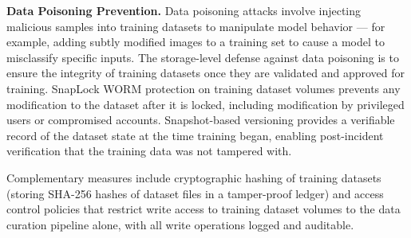 \begin{securitybox}
\textbf{Data Poisoning Prevention.}
Data poisoning attacks involve injecting malicious samples into training
datasets to manipulate model behavior --- for example, adding subtly modified
images to a training set to cause a model to misclassify specific inputs. The
storage-level defense against data poisoning is to ensure the integrity of
training datasets once they are validated and approved for training. SnapLock
WORM protection on training dataset volumes prevents any modification to the
dataset after it is locked, including modification by privileged users or
compromised accounts. Snapshot-based versioning provides a verifiable record
of the dataset state at the time training began, enabling post-incident
verification that the training data was not tampered with.

Complementary measures include cryptographic hashing of training datasets
(storing SHA-256 hashes of dataset files in a tamper-proof ledger) and access
control policies that restrict write access to training dataset volumes to the
data curation pipeline alone, with all write operations logged and auditable.

\end{securitybox}

